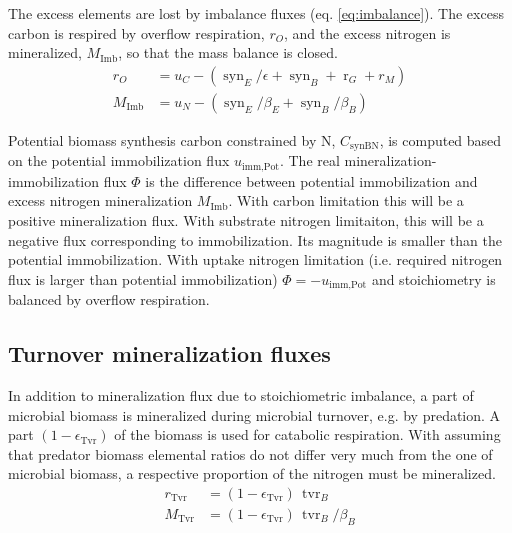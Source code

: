 The excess elements are lost by imbalance fluxes (eq. \ref{eq:imbalance}).
The excess carbon is respired by overflow respiration, $r_O$, and the excess
nitrogen is mineralized, $M_{\operatorname{Imb}}$, so that the mass
balance is closed.
\begin{subequations}
\label{eq:imbalance}
\begin{align}
r_O &= u_C - (\operatorname{syn}_E /\epsilon  + \operatorname{syn}_B
+ \operatorname{r}_G + r_M )\\
M_{\operatorname{Imb}} &= u_N - (\operatorname{syn}_E/\beta_E +
\operatorname{syn}_{B}/\beta_B)
\end{align}
\end{subequations}

Potential biomass synthesis carbon constrained by N, $C_{\operatorname{synBN}}$,
is computed based on the potential immobilization flux
$u_{\operatorname{imm,Pot}}$. The real mineralization-immobilization flux $\Phi$ is the difference
between potential immobilization and excess nitrogen mineralization
$M_{\operatorname{Imb}}$. With carbon limitation this will be a positive
mineralization flux. With substrate nitrogen limitaiton, this will be a
negative flux corresponding to immobilization. Its magnitude is smaller than
the potential immobilization.
With uptake nitrogen limitation (i.e. required nitrogen flux is larger than
potential immobilization) $\Phi = -u_{\operatorname{imm,Pot}}$ and stoichiometry
is balanced by overflow respiration.

\subsection{Turnover mineralization fluxes}
In addition to mineralization flux due to stoichiometric imbalance, a part of
microbial biomass is mineralized during microbial turnover, e.g. by predation. A
part $(1-\epsilon_{\operatorname{Tvr}})$ of the biomass is used for catabolic
respiration. With assuming that predator biomass elemental ratios do not differ
very much from the one of microbial biomass, a respective proportion of the
nitrogen must be mineralized.
\begin{subequations}
\label{eq:tvrB}
\begin{align}
r_{\operatorname{Tvr}} &= (1-\epsilon_{\operatorname{Tvr}}) \,
\operatorname{tvr}_B
\\
M_{\operatorname{Tvr}} &= (1-\epsilon_{\operatorname{Tvr}}) \,
\operatorname{tvr}_{B} / \beta_B
\end{align}
\end{subequations}

